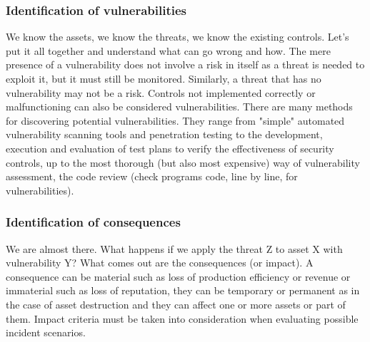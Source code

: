 \subsubsection{Identification of vulnerabilities}
We know the assets, we know the threats, we know the existing controls. Let's put it all together and understand what can go wrong and how. The mere presence of a vulnerability does not involve a risk in itself as a threat is needed to exploit it, but it must still be monitored. Similarly, a threat that has no vulnerability may not be a risk. Controls not implemented correctly or malfunctioning can also be considered vulnerabilities. There are many methods for discovering potential vulnerabilities. They range from "simple" automated vulnerability scanning tools and penetration testing to the development, execution and evaluation of test plans to verify the effectiveness of security controls, up to the most thorough (but also most expensive) way of vulnerability assessment, the code review (check programs code, line by line, for vulnerabilities).
\subsubsection{Identification of consequences}
We are almost there. What happens if we apply the threat Z to asset X with vulnerability Y? What comes out are the consequences (or impact). A consequence can be material such as loss of production efficiency or revenue or immaterial such as loss of reputation, they can be temporary or permanent as in the case of asset destruction and they can affect one or more assets or part of them. Impact criteria must be taken into consideration when evaluating possible incident scenarios.
